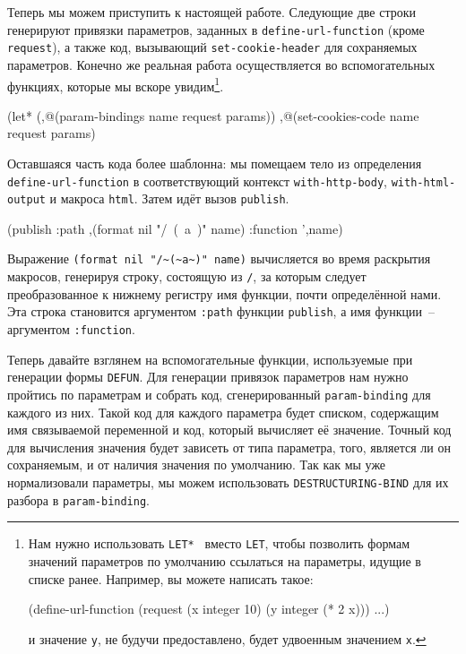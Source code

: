 Теперь мы можем приступить к настоящей работе. Следующие две строки генерируют привязки
параметров, заданных в \lstinline{define-url-function} (кроме \lstinline{request}), а также код,
вызывающий \lstinline{set-cookie-header} для сохраняемых параметров. Конечно же реальная работа
осуществляется во вспомогательных функциях, которые мы вскоре увидим\footnote{Нам нужно
  использовать \lstinline{LET* } вместо \lstinline{LET}, чтобы позволить формам значений
  параметров по умолчанию ссылаться на параметры, идущие в списке ранее. Например, вы
  можете написать такое:

\begin{myverb}
  (define-url-function (request (x integer 10) (y integer (* 2 x))) ...)
\end{myverb}

\noindent{}и значение \lstinline{y}, не будучи предоставлено, будет удвоенным значением \lstinline{x}.}.

\begin{myverb}
  (let* (,@(param-bindings name request params))
    ,@(set-cookies-code name request params)
\end{myverb}

Оставшаяся часть кода более шаблонна: мы помещаем тело из определения
\lstinline{define-url-function} в соответствующий контекст \lstinline{with-http-body},
\lstinline{with-html-output} и макроса \lstinline{html}. Затем идёт вызов \lstinline{publish}.

\begin{myverb}
  (publish :path ,(format nil "/~(~a~)" name) :function ',name)
\end{myverb}

Выражение \lstinline!(format nil "/~(~a~)" name)! вычисляется во время раскрытия макросов,
генерируя строку, состоящую из \lstinline{/}, за которым следует преобразованное к нижнему
регистру имя функции, почти определённой нами. Эта строка становится аргументом
\lstinline{:path} функции \lstinline{publish}, а имя функции~-- аргументом \lstinline{:function}.

Теперь давайте взглянем на вспомогательные функции, используемые при генерации формы
\lstinline{DEFUN}. Для генерации привязок параметров нам нужно пройтись по параметрам и
собрать код, сгенерированный \lstinline{param-binding} для каждого из них. Такой код для
каждого параметра будет списком, содержащим имя связываемой переменной и код, который
вычисляет её значение. Точный код для вычисления значения будет зависеть от типа
параметра, того, является ли он сохраняемым, и от наличия значения по умолчанию. Так как
мы уже нормализовали параметры, мы можем использовать \lstinline{DESTRUCTURING-BIND} для их
разбора в \lstinline{param-binding}.

